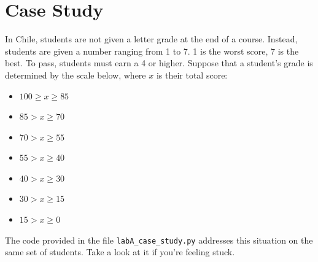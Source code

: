 \documentclass{article}
\begin{document}
\section{Case Study}

In Chile, students are not given a letter grade at the end of a course. Instead, students are given a number ranging from 1 to 7. 1 is the worst score, 7 is the best. To pass, students must earn a 4 or higher. Suppose that a student's  grade is determined by the scale below, where $x$ is their total score:

\begin{minipage}{0.3\linewidth}
\begin{itemize}
	\setlength\itemsep{0em}
	\item[Seven:] $100\ge x \ge 85$
	\item[Six:] $85> x \ge 70$
	\item[Five:] $70> x \ge 55$
	\item[Four:] $55> x \ge 40$
	\item[Three:] $40> x \ge 30$
	\item[Two:] $30> x \ge 15$
	\item[One:] $15> x \ge 0$
\end{itemize}
\end{minipage}
\begin{minipage}{0.65\linewidth}
	The code provided in the file \texttt{labA\_case\_study.py} addresses this situation on the same set of students. Take a look at it if you're feeling stuck.
\end{minipage}
\end{document}
